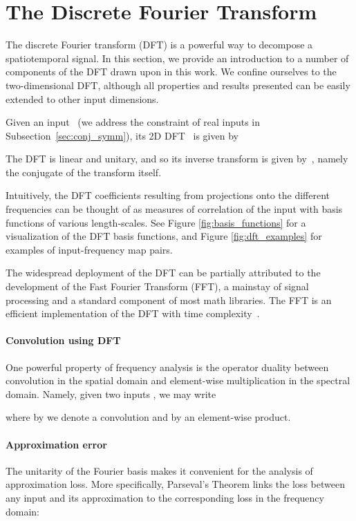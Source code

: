 \documentclass{article} \usepackage{nips15submit_e,times}
\begin{document}
\section{The Discrete Fourier Transform}
\label{sec:dft}
The discrete Fourier transform (DFT) is a powerful way to decompose a spatiotemporal signal. In this section, we provide an introduction to a number of components of the DFT drawn upon in this work. We confine ourselves to the two-dimensional DFT, although all properties and results presented can be easily extended to other input dimensions. 

Given an input~ (we address the constraint of real inputs in Subsection~\ref{sec:conj_symm}), its 2D DFT~ is given by


The DFT is linear and unitary, and so its inverse transform is given by~, namely the conjugate of the transform itself. 

Intuitively, the DFT coefficients resulting from projections onto the different frequencies can be thought of as measures of correlation of the input with basis functions of various length-scales. See Figure \ref{fig:basis_functions} for a visualization of the DFT basis functions, and Figure \ref{fig:dft_examples} for examples of input-frequency map pairs. 

The widespread deployment of the DFT can be partially attributed to the development of the Fast Fourier Transform (FFT), a mainstay of signal processing and a standard component of most math libraries. The FFT is an efficient implementation of the DFT with time complexity~.

\paragraph{Convolution using DFT} One powerful property of frequency analysis is the operator duality between convolution in the spatial domain and element-wise multiplication in the spectral domain.  Namely, given two inputs , we may write

where by  we denote a convolution and by  an element-wise product.

\paragraph{Approximation error} The unitarity of the Fourier basis makes it convenient for the analysis of approximation loss. More specifically, Parseval's Theorem links the  loss between any input  and its approximation  to the corresponding loss in the frequency domain:
\end{document}
